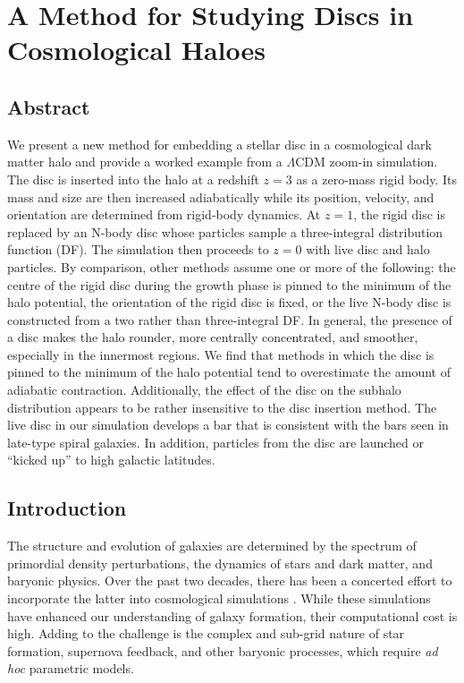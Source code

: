 \chapter{A Method for Studying Discs in Cosmological Haloes} \label{ch:paper_i}

\section{Abstract}

We present a new method for embedding a stellar disc in a
cosmological dark matter halo and provide a worked example from a
$\Lambda$CDM zoom-in simulation.  The disc is inserted into the halo
at a redshift $z=3$ as a zero-mass rigid body.  Its mass and size
are then increased adiabatically while its position, velocity, and
orientation are determined from rigid-body dynamics.  At $z=1$,
the rigid disc is replaced by an N-body disc whose particles sample
a three-integral distribution function (DF).  The simulation then
proceeds to $z=0$ with live disc and halo particles.  By comparison,
other methods assume one or more of the following: the
centre of the rigid disc during the growth phase is pinned to the
minimum of the halo potential,  the orientation of the rigid disc is
fixed,  or the live N-body disc is constructed from a two rather than
three-integral DF.  In general, the presence of a disc makes the halo
rounder, more centrally concentrated, and smoother, especially in
the innermost regions.  We find that methods in which the disc is
pinned to the minimum of the halo potential tend to overestimate the
amount of adiabatic contraction.  Additionally, the effect of
the disc on the subhalo distribution appears to be rather insensitive
to the disc insertion method.  The live disc in our simulation
develops a bar that is consistent with the bars seen in late-type
spiral galaxies. In addition, particles from the disc are
launched or ``kicked up'' to high galactic latitudes.

\section{Introduction}

The structure and evolution of galaxies are determined by the spectrum
of primordial density perturbations, the dynamics of stars and dark
matter, and baryonic physics.  Over the past two decades, there has
been a concerted effort to incorporate the latter into cosmological
simulations \citep[e.g.][]{katz1996feedback, springel2003feedback,
  stinson2006, RoskarDiskMisalignment, pakmorMHD, gomezwarps}.  While
these simulations have enhanced our understanding of galaxy formation,
their computational cost is high.  Adding to the challenge is the
complex and sub-grid nature of star formation, supernova feedback, and
other baryonic processes, which require {\it ad hoc} parametric
models.

